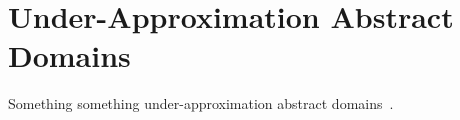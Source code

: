 
\chapter{Under-Approximation Abstract Domains}\label{ch:limits-underapprox-domains}
Something something under-approximation abstract domains~\cite{ABG22,ABG24}.
